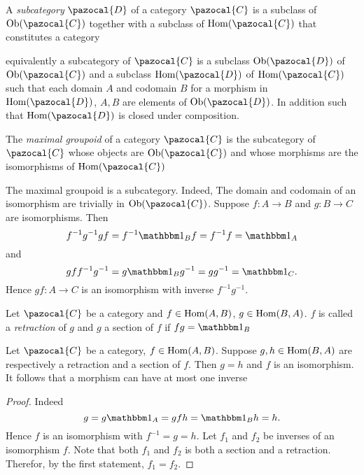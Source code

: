 \begin{definition}
    A \textit{subcategory} $\pazocal{D}$ of a category $\pazocal{C}$ is a subclass of $\Ob(\pazocal{C})$ together with a subclass of $\Hom(\pazocal{C})$ that constitutes a category
\end{definition}
\begin{remark}
    equivalently a subcategory of $\pazocal{C}$ is a subclass $\Ob(\pazocal{D})$ of $\Ob(\pazocal{C})$ and a subclass $\Hom(\pazocal{D})$ of $\Hom(\pazocal{C})$ such that each domain $A$ and codomain $B$ for a morphism in $\Hom(\pazocal{D})$, $A,B$ are elements of $\Ob(\pazocal{D})$. In addition such that $\Hom(\pazocal{D})$ is closed under composition. 
\end{remark}
\begin{definition}
    The \textit{maximal groupoid} of a category $\pazocal{C}$ is the subcategory of $\pazocal{C}$ whose objects are $\Ob(\pazocal{C})$ and whose morphisms are the isomorphisms of $\Hom(\pazocal{C})$
\end{definition}
\begin{remark}
    The maximal groupoid is a subcategory. Indeed, The domain and codomain of an isomorphism are trivially in $\Ob(\pazocal{C})$. Suppose $f:A\rightarrow B$ and $g: B \rightarrow C$ are isomorphisms. Then 
    $$f^{-1}g^{-1}gf=f^{-1}\fone_B f = f^{-1}f = \fone_A$$
    and 
    $$gff^{-1}g^{-1} = g\fone_B g^{-1} = gg^{-1} = \fone_C.$$
    Hence $gf: A \rightarrow C$ is an isomorphism with inverse $f^{-1}g^{-1}$. 
\end{remark}
\begin{definition}
    Let $\pazocal{C}$ be a category and $f\in \mathrm{Hom}(A,B)$, $g\in \mathrm{Hom}(B,A)$.  $f$ is called a \textit{retraction} of $g$ and $g$ a section of $f$ if $fg = \fone_B$   
\end{definition}
\begin{lemma}\label{AtMostOneIso}
    Let $\pazocal{C}$ be a category, $f\in \mathrm{Hom}(A,B)$. Suppose $g,h\in \mathrm{Hom}(B,A)$ are respectively a retraction and a section of $f$. Then $g=h$ and $f$ is an isomorphism. It follows that a morphism can have at most one inverse
\end{lemma}
\begin{proof}
    Indeed 
    $$g=g\fone_A = gfh=\fone_B h = h.$$
    Hence $f$ is an isomorphism with $f^{-1} = g=h$. Let $f_1$ and $f_2$ be inverses of an isomorphism $f$. Note that both $f_1$ and $f_2$ is both a section and a retraction. Therefor, by the first statement, $f_1=f_2$.   
\end{proof}
